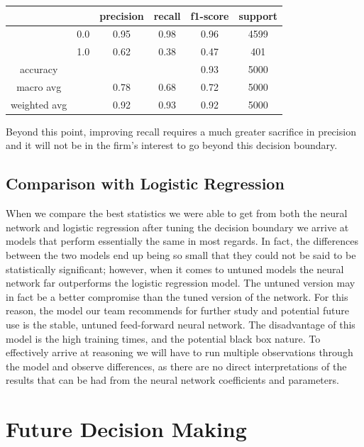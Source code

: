 \documentclass[12pt]{article}
\begin{document}
	\begin{tabular}{c|c|c|c|c|c}
		\hline
		& 		& 	precision &  recall  & f1-score   & support \\ \hline
		
		&  0.0	&		0.95 &     0.98   &  0.96   &  4599 \\ \hline
		&  1.0  &		0.62 &     0.38   &  0.47   &   401 \\ \hline
		
		accuracy    & & & &                       		  0.93   &   5000 \\ \hline
		macro avg   & &   			0.78   &   0.68  &    0.72   &   5000  \\ \hline
		weighted avg  & &   		0.92   &   0.93  &    0.92   &   5000 \\ \hline
	\end{tabular}
	
	Beyond this point, improving recall requires a much greater sacrifice in precision and it will not be in the firm's interest to go beyond this decision boundary. 
	
	\subsection{Comparison with Logistic Regression}
	
	When we compare the best statistics we were able to get from both the neural network and logistic regression after tuning the decision boundary we arrive at models that perform essentially the same in most regards. In fact, the differences between the two models end up being so small that they could not be said to be statistically significant; however, when it comes to untuned models the neural network far outperforms the logistic regression model. The untuned version may in fact be a better compromise than the tuned version of the network. For this reason, the model our team recommends for further study and potential future use is the stable, untuned feed-forward neural network. The disadvantage of this model is the high training times, and the potential black box nature. To effectively arrive at reasoning we will have to run multiple observations through the model and observe differences, as there are no direct interpretations of the results that can be had from the neural network coefficients and parameters. 
	
	
	\section{Future Decision Making}
	
\end{document}
